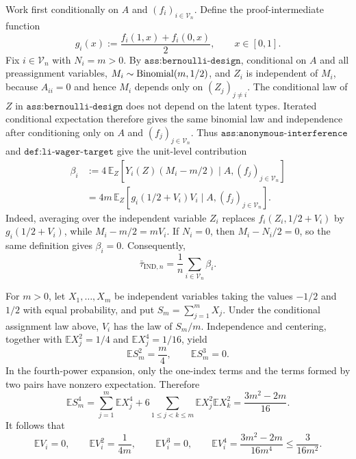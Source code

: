 Work first conditionally on \(A\) and \((f_i)_{i\in\mathcal V_n}\).  Define the proof-intermediate function
\[
g_i(x):=\frac{f_i(1,x)+f_i(0,x)}{2},\qquad x\in[0,1].
\]
Fix \(i\in\mathcal V_n\) with \(N_i=m>0\).  By \(\texttt{ass:bernoulli-design}\), conditional on \(A\) and all preassignment variables, \(M_i\sim {\rm Binomial}(m,1/2)\), and \(Z_i\) is independent of \(M_i\), because \(A_{ii}=0\) and hence \(M_i\) depends only on \((Z_j)_{j\ne i}\).  The conditional law of \(Z\) in \(\texttt{ass:bernoulli-design}\) does not depend on the latent types.  Iterated conditional expectation therefore gives the same binomial law and independence after conditioning only on \(A\) and \((f_j)_{j\in\mathcal V_n}\).  Thus \(\texttt{ass:anonymous-interference}\) and \(\texttt{def:li-wager-target}\) give the unit-level contribution
\[
\begin{aligned}
\beta_i
&:=4\,\mathbb E_Z\!\left[Y_i(Z)(M_i-m/2)\mid A,(f_j)_{j\in\mathcal V_n}\right]\\
&=4m\,\mathbb E_Z\!\left[g_i(1/2+V_i)V_i\mid A,(f_j)_{j\in\mathcal V_n}\right].
\end{aligned}
\]
Indeed, averaging over the independent variable \(Z_i\) replaces \(f_i(Z_i,1/2+V_i)\) by \(g_i(1/2+V_i)\), while \(M_i-m/2=mV_i\).  If \(N_i=0\), then \(M_i-N_i/2=0\), so the same definition gives \(\beta_i=0\).  Consequently,
\[
\bar\tau_{\mathrm{IND},n}=\frac1n\sum_{i\in\mathcal V_n}\beta_i.
\]

For \(m>0\), let \(X_1,\ldots,X_m\) be independent variables taking the values \(-1/2\) and \(1/2\) with equal probability, and put \(S_m=\sum_{j=1}^mX_j\).  Under the conditional assignment law above, \(V_i\) has the law of \(S_m/m\).  Independence and centering, together with \(\mathbb E X_j^2=1/4\) and \(\mathbb E X_j^4=1/16\), yield
\[
\mathbb E S_m^2=\frac m4,
\qquad
\mathbb E S_m^3=0.
\]
In the fourth-power expansion, only the one-index terms and the terms formed by two pairs have nonzero expectation.  Therefore
\[
\mathbb E S_m^4
=\sum_{j=1}^m\mathbb E X_j^4
+6\sum_{1\le j<k\le m}\mathbb E X_j^2\mathbb E X_k^2
=\frac{3m^2-2m}{16}.
\]
It follows that
\[
\mathbb E V_i=0,
\qquad
\mathbb E V_i^2=\frac1{4m},
\qquad
\mathbb E V_i^3=0,
\qquad
\mathbb E V_i^4=\frac{3m^2-2m}{16m^4}\le\frac3{16m^2}.
\]

